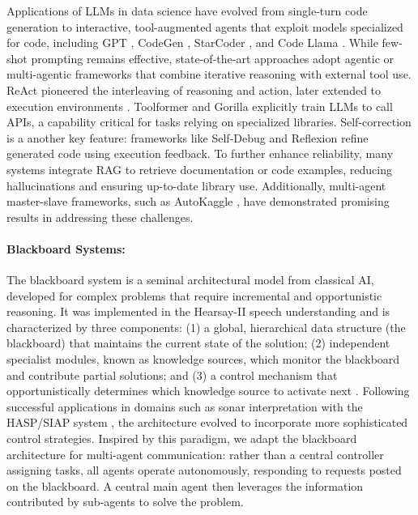 Applications of LLMs in data science have evolved from single-turn code generation to interactive, tool-augmented agents that exploit models specialized for code, including GPT \citep{10.5555/3495724.3495883}, CodeGen \citep{rubavicius2025conversationalcodegenerationcase}, StarCoder \citep{li2023starcoder}, and Code Llama \citep{codellama}. While few-shot prompting \citep{10.5555/3495724.3495883} remains effective, state-of-the-art approaches adopt agentic or multi-agentic frameworks that combine iterative reasoning with external tool use. ReAct \citep{yao2023react} pioneered the interleaving of reasoning and action, later extended to execution environments \citep{chen2018executionguided}. Toolformer \citep{schick2023toolformer} and Gorilla \citep{patil2024gorilla} explicitly train LLMs to call APIs, a capability critical for tasks relying on specialized libraries. Self-correction is a another key feature: frameworks like Self-Debug \citep{chen2024teaching} and Reflexion \citep{shinn2023reflexion} refine generated code using execution feedback. To further enhance reliability, many systems integrate RAG \citep{10.5555/3495724.3496517, salemi2025planandrefinediversecomprehensiveretrievalaugmented, 10.1145/3731120.3744584, 10.1145/3626772.3657733} to retrieve documentation or code examples, reducing hallucinations and ensuring up-to-date library use. Additionally, multi-agent master-slave frameworks, such as AutoKaggle \citep{li2025autokaggle}, have demonstrated promising results in addressing these challenges.

\paragraph{Blackboard Systems:}

The blackboard system is a seminal architectural model from classical AI, developed for complex problems that require incremental and opportunistic reasoning. It was implemented in the Hearsay-II speech understanding \citep{10.1145/356810.356816} and is characterized by three components: (1) a global, hierarchical data structure (the blackboard) that maintains the current state of the solution; (2) independent specialist modules, known as knowledge sources, which monitor the blackboard and contribute partial solutions; and (3) a control mechanism that opportunistically determines which knowledge source to activate next \citep{Nii_1986}. Following successful applications in domains such as sonar interpretation with the HASP/SIAP system \citep{Nii_Feigenbaum_Anton_1982}, the architecture evolved to incorporate more sophisticated control strategies. Inspired by this paradigm, we adapt the blackboard architecture for multi-agent communication: rather than a central controller assigning tasks, all agents operate autonomously, responding to requests posted on the blackboard. A central main agent then leverages the information contributed by sub-agents to solve the problem.

